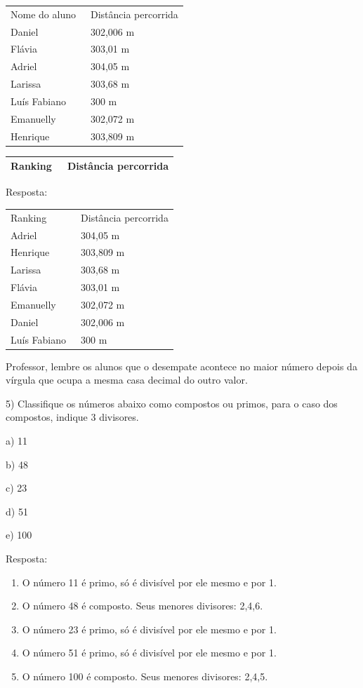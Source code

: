 \begin{longtable}[]{@{}ll@{}}
\toprule
\endhead
Nome do aluno~ & Distância percorrida\tabularnewline
Daniel~ & 302,006 m\tabularnewline
Flávia~ & 303,01 m\tabularnewline
Adriel~ & 304,05 m\tabularnewline
Larissa~ & 303,68 m\tabularnewline
Luís Fabiano~ & 300 m~\tabularnewline
Emanuelly~ & 302,072 m\tabularnewline
Henrique~ & 303,809 m\tabularnewline
\bottomrule
\end{longtable}

\begin{longtable}[]{@{}ll@{}}
\toprule
\endhead
\begin{minipage}[t]{0.14\columnwidth}\raggedright
Ranking~\strut
\end{minipage} & \begin{minipage}[t]{0.30\columnwidth}\raggedright
Distância percorrida\strut
\end{minipage}\tabularnewline
\bottomrule
\end{longtable}

Resposta:

\begin{longtable}[]{@{}ll@{}}
\toprule
\endhead
Ranking~ & Distância percorrida\tabularnewline
Adriel~ & 304,05 m\tabularnewline
Henrique~ & 303,809 m\tabularnewline
Larissa~ & 303,68 m\tabularnewline
Flávia~ & 303,01 m\tabularnewline
Emanuelly~ & 302,072 m\tabularnewline
Daniel~ & 302,006 m\tabularnewline
Luís Fabiano~ & 300 m~\tabularnewline
\bottomrule
\end{longtable}

Professor, lembre os alunos que o desempate acontece no maior número
depois da vírgula que ocupa a mesma casa decimal do outro valor.

5) Classifique os números abaixo como compostos ou primos, para o caso
dos compostos, indique 3 divisores.

a) 11

b) 48

c) 23

d) 51

e) 100

Resposta:

\begin{enumerate}
\def\labelenumi{\alph{enumi})}
\item
  O número 11 é primo, só é divisível por ele mesmo e por 1.
\item
  O número 48 é composto. Seus menores divisores: 2,4,6.
\item
  O número 23 é primo, só é divisível por ele mesmo e por 1.
\item
  O número 51 é primo, só é divisível por ele mesmo e por 1.
\item
  O número 100 é composto. Seus menores divisores: 2,4,5.
\end{enumerate}

